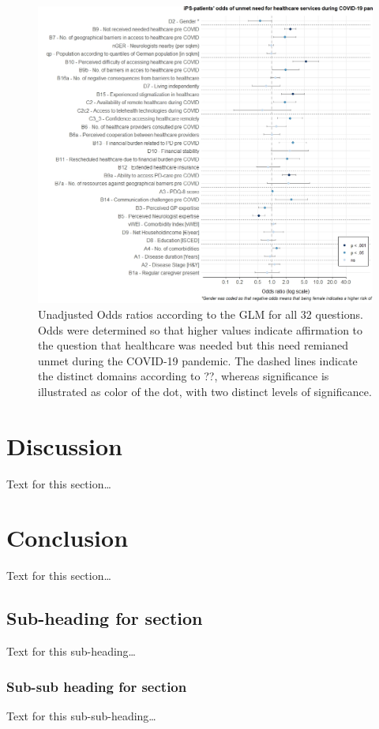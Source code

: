 \documentclass{bmcart}
\begin{document}
\begin{figure}
\centering
\includegraphics[width=.90\textwidth]{fig3.oddsratios.v1.0.jpeg}
\caption{Unadjusted Odds ratios according to the \textsc{GLM} for all 32 questions. Odds were determined so that higher values indicate affirmation to the question that healthcare was needed but this need remianed unmet during the COVID-19 pandemic. The dashed lines indicate the distinct domains according to ??, whereas significance is illustrated as color of the dot, with two distinct levels of significance. }%
\label{fig3:resultsOR1}
\end{figure}




\newpage

	\section*{Discussion}
	Text for this section\ldots
	\section*{Conclusion}
	Text for this section\ldots
	\subsection*{Sub-heading for section}
	Text for this sub-heading\ldots
	\subsubsection*{Sub-sub heading for section}
	Text for this sub-sub-heading\ldots
\end{document}
